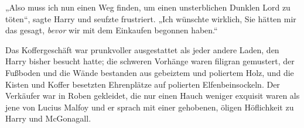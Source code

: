 „Also muss ich nun einen Weg finden, um einen unsterblichen Dunklen Lord zu töten“, sagte Harry und seufzte frustriert.
„Ich wünschte wirklich, Sie hätten mir das gesagt, \emph{bevor} wir mit dem Einkaufen begonnen haben.“

\later

Das Koffergeschäft war prunkvoller ausgestattet als jeder andere Laden, den Harry bisher besucht hatte; die schweren Vorhänge waren filigran gemustert, der Fußboden und die Wände bestanden aus gebeiztem und poliertem Holz, und die Kisten und Koffer besetzten Ehrenplätze auf polierten Elfenbeinsockeln. Der Verkäufer war in Roben gekleidet, die nur einen Hauch weniger exquisit waren als jene von Lucius Malfoy und er sprach mit einer gehobenen, öligen Höflichkeit zu Harry und McGonagall.

